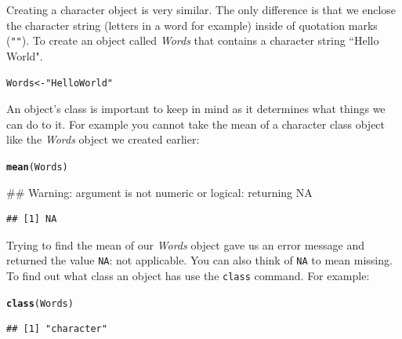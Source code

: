 \documentclass[ChapterTOCs,krantz1]{krantz}\usepackage{graphicx, color}
\makeatletter
\newcommand{\hlfunctioncall}[1]{\textcolor[rgb]{0.501960784313725,0,0.329411764705882}{\textbf{#1}}}%
\newcommand{\hlstring}[1]{\textcolor[rgb]{0.6,0.6,1}{#1}}%
\newenvironment{kframe}{%
 \def\at@end@of@kframe{}%
 \ifinner\ifhmode%
  \def\at@end@of@kframe{\end{minipage}}%
  \begin{minipage}{\columnwidth}%
 \fi\fi%
 \def\FrameCommand##1{\hskip\@totalleftmargin \hskip-\fboxsep
 \colorbox{shadecolor}{##1}\hskip-\fboxsep
     \hskip-\linewidth \hskip-\@totalleftmargin \hskip\columnwidth}%
 \MakeFramed {\advance\hsize-\width
   \@totalleftmargin\z@ \linewidth\hsize
   \@setminipage}}%
 {\par\unskip\endMakeFramed%
 \at@end@of@kframe}
\newenvironment{knitrout}{}{} %
\makeatother
\begin{document}
\noindent Creating a character object is very similar. The only difference is that we enclose the character string (letters in a word for example) inside of quotation marks ({\tt{""}}). To create an object called {\emph{Words}} that contains a character string ``Hello World".

\begin{knitrout}
\color{fgcolor}\begin{kframe}
\begin{alltt}
Words <- \hlstring{"Hello World"}
\end{alltt}
\end{kframe}
\end{knitrout}



An object's class is important to keep in mind as it determines what things we can do to it. For example you cannot take the mean of a character class object like the {\emph{Words}} object we created earlier:

\begin{knitrout}
\color{fgcolor}\begin{kframe}
\begin{alltt}
\hlfunctioncall{mean}(Words)
\end{alltt}


{\ttfamily\noindent\textcolor{warningcolor}{\#\# Warning: argument is not numeric or logical: returning NA}}\begin{verbatim}
## [1] NA
\end{verbatim}
\end{kframe}
\end{knitrout}


\noindent Trying to find the mean of our {\emph{Words}} object gave us an error message and returned the value {\tt{NA}}: not applicable. You can also think of {\tt{NA}} to mean missing. To find out what class an object has use the {\tt{class}} command. For example:

\begin{knitrout}
\color{fgcolor}\begin{kframe}
\begin{alltt}
\hlfunctioncall{class}(Words)
\end{alltt}
\begin{verbatim}
## [1] "character"
\end{verbatim}
\end{kframe}
\end{knitrout}
\end{document}
